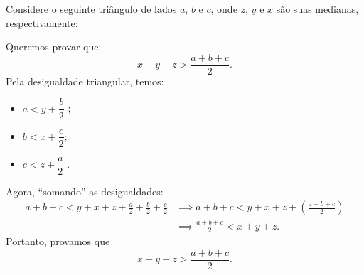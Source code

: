 



Considere o seguinte triângulo de lados $a$, $b$ e $c$, onde $z$, $y$ e $x$ são suas medianas, respectivamente:

\begin{center}
\end{center}

Queremos provar que:
    $$x + y + z > \dfrac{a+b+c}{2}.$$
    Pela desigualdade triangular, temos:
    \begin{itemize}
      \item  $a < y + \dfrac{b}{2}$ ;
       \item $b < x + \dfrac{c}{2}$;
       \item  $c < z + \dfrac{a}{2}$ .
    \end{itemize}
    Agora, ``somando'' as desigualdades:
    \begin{align*}
        a + b + c < y + x + z + \frac{a}{2} + \frac{b}{2} + \frac{c}{2} 
        & \implies a + b + c < y + x + z + \left(\frac{a+b+c}{2}\right)\\
        & \implies \frac{a+b+c}{2} < x+y+z.
    \end{align*}
    Portanto, provamos que $$x+y+z > \frac{a+b+c}{2}.$$









